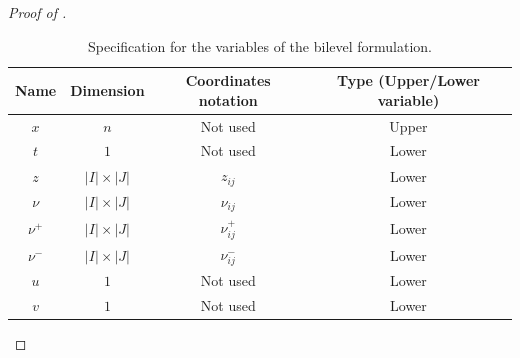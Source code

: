 \documentclass{article}
\theoremstyle{plain}
\theoremstyle{definition}
\begin{document}
\begin{proof}[Proof of ]
    \begin{table}[bhtp]
        \centering
        \begin{tabular}{cccc}
            \toprule
             Name & Dimension & Coordinates notation & Type (Upper/Lower variable) \\
             \midrule
             $x$ & $n$ & Not used & Upper \\ 
             \midrule
             $t$ & $1$ & Not used & Lower \\
             \midrule
             $z$ & $|I| \times |J|$ & $z_{ij}$ & Lower \\
             \midrule
             $\nu$ & $|I| \times |J| $ & $\nu_{ij}$ & Lower \\
             \midrule
             $\nu^+$ & $|I| \times |J| $ & $\nu_{ij}^+$ & Lower \\
             \midrule
             $\nu^-$ & $|I| \times |J| $ & $\nu_{ij}^-$ & Lower \\
             \midrule
             $u$ & $1$ & Not used & Lower \\
             \midrule
             $v$ & $1$ & Not used & Lower \\
             \bottomrule
        \end{tabular}
        \caption{Specification for the variables of the bilevel formulation.}
        \label{tab:variables-semi-algebraic-function}
    \end{table}


\end{proof}
\end{document}

